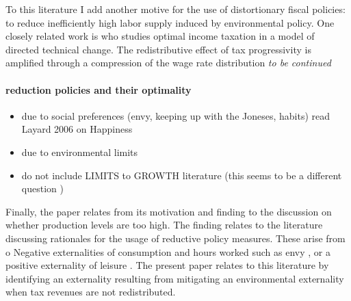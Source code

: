 To this literature I add another motive for the use of distortionary fiscal policies: to reduce inefficiently high labor supply induced by environmental policy. 
One closely related work is \cite{Loebbing2019NationalChange} who studies optimal income taxation in a model of directed technical change. The redistributive effect of tax progressivity is amplified through a compression of the wage rate distribution \textit{to be continued}

\paragraph{reduction policies and their optimality}
\begin{itemize}
	\item due to social preferences (envy, keeping up with the Joneses, habits) \ar read Layard 2006 on Happiness
	\item due to environmental limits
	\item do not include LIMITS to GROWTH literature (this seems to be a different question )
\end{itemize}
Finally, the paper relates from its motivation and finding to the discussion on whether production levels are too high. 
The finding relates to the literature discussing rationales for the usage of reductive policy measures. These arise from o
Negative externalities of consumption and hours worked such as
envy \cite{Alvarez-Cuadrado2007EnvyHours}, or a positive externality of leisure \cite{Alesina2005WorkDifferent}. The present paper relates to this literature by identifying an externality resulting from mitigating an environmental externality when tax revenues are not redistributed.

